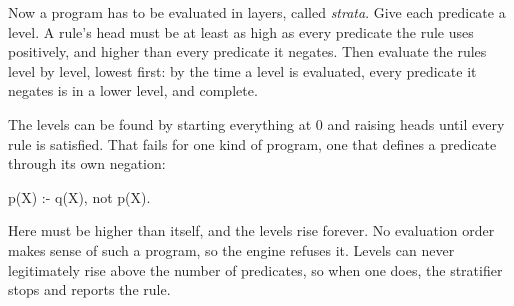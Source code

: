Now a program has to be evaluated in layers, called \emph{strata}. Give each
predicate a level. A rule's head must be at least as high as every
predicate the rule uses positively, and higher than every predicate it
negates. Then evaluate the rules level by level, lowest first: by the time
a level is evaluated, every predicate it negates is in a lower level, and
complete.

The levels can be found by starting everything at 0 and raising heads until
every rule is satisfied. That fails for one kind of program, one that defines
a predicate through its own negation:

\begin{shell}
p(X) :- q(X), not p(X).
\end{shell}

Here  must be higher than itself, and the levels rise forever. No
evaluation order makes sense of such a program, so the engine refuses it.
Levels can never legitimately rise above the number of predicates, so when
one does, the stratifier stops and reports the rule.

